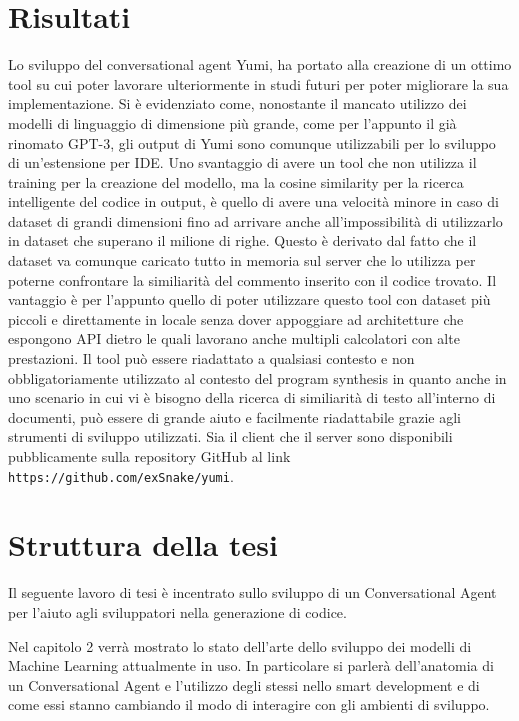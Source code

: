 \section{Risultati}
Lo sviluppo del conversational agent Yumi, ha portato alla creazione di un ottimo tool su cui poter lavorare ulteriormente in studi futuri per poter migliorare la sua implementazione. Si è evidenziato come, nonostante il mancato utilizzo dei modelli di linguaggio di dimensione più grande, come per l'appunto il già rinomato GPT-3, gli output di Yumi sono comunque utilizzabili per lo sviluppo di un'estensione per IDE. Uno svantaggio di avere un tool che non utilizza il training per la creazione del modello, ma la cosine similarity per la ricerca intelligente del codice in output, è quello di avere una velocità minore in caso di dataset di grandi dimensioni fino ad arrivare anche all'impossibilità di utilizzarlo in dataset che superano il milione di righe. Questo è derivato dal fatto che il dataset va comunque caricato tutto in memoria sul server che lo utilizza per poterne confrontare la similiarità del commento inserito con il codice trovato. Il vantaggio è per l'appunto quello di poter utilizzare questo tool con dataset più piccoli e direttamente in locale senza dover appoggiare ad architetture che espongono API dietro le quali lavorano anche multipli calcolatori con alte prestazioni. Il tool può essere riadattato a qualsiasi contesto e non obbligatoriamente utilizzato al contesto del program synthesis in quanto anche in uno scenario in cui vi è bisogno della ricerca di similiarità di testo all'interno di documenti, può essere di grande aiuto e facilmente riadattabile grazie agli strumenti di sviluppo utilizzati. Sia il client che il server sono disponibili pubblicamente sulla repository GitHub al link \texttt{https://github.com/exSnake/yumi}.


\section{Struttura della tesi}
Il seguente lavoro di tesi è incentrato sullo sviluppo di un Conversational Agent per l'aiuto agli sviluppatori nella generazione di codice.

Nel capitolo 2 verrà mostrato lo stato dell'arte dello sviluppo dei modelli di Machine Learning attualmente in uso. In particolare si parlerà dell'anatomia di un Conversational Agent e l'utilizzo degli stessi nello smart development e di come essi stanno cambiando il modo di interagire con gli ambienti di sviluppo.

